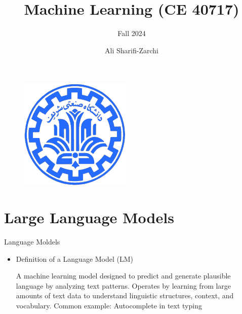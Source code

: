 \documentclass[serif, aspectratio=169]{beamer}
\author{Ali Sharifi-Zarchi}
\title{Machine Learning (CE 40717)}
\subtitle{Fall 2024}
\institute{
    CE Department \\
    Sharif University of Technology
}
\begin{document}
\begin{frame}
    \titlepage
    \vspace*{-0.6cm}
    \begin{figure}[htpb]
        \begin{center}
            \includegraphics[keepaspectratio, scale=0.25]{pic/sharif-main-logo.png}
        \end{center}
    \end{figure}
\end{frame}

\begin{frame}    
\tableofcontents[sectionstyle=show,
subsectionstyle=show/shaded/hide,
subsubsectionstyle=show/shaded/hide]
\end{frame}

\section{Large Language Models}

\begin{frame}{Language Moldels}
    \begin{itemize}
        \item 
            \large{Definition of a Language Model (LM)}
         \vspace{0.5cm}
        \begin{outline}
            \1 A machine learning model designed to predict and generate plausible language by analyzing text patterns.
            \vspace{0.2cm}
            \1 Operates by learning from large amounts of text data to understand linguistic structures, context, and vocabulary.
            \2 Common example: Autocomplete in text typing
        \end{outline}
    \end{itemize}
     
\end{frame}
\end{document}
